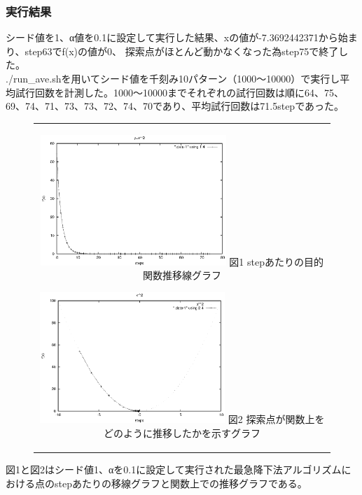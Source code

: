 \subsubsection{実行結果}

シード値を1、α値を0.1に設定して実行した結果、xの値が-7.3692442371から始まり、step63でf(x)の値が0、
探索点がほとんど動かなくなった為step75で終了した。\\
./run\_ave.shを用いてシード値を千刻み10パターン（1000〜10000）で実行し平均試行回数を計測した。1000〜10000までそれぞれの試行回数は順に64、75、69、74、71、73、73、72、74、70であり、平均試行回数は71.5stepであった。
\newline
\begin{figure}[htbp]
  \begin{center}
    \begin{tabular}{c}

      \begin{minipage}{0.5\hsize}
        \begin{center}
          \includegraphics[clip, width=7cm]{./figs/sim2-1_step-1.eps}
          \hspace{1.6cm} 図1 stepあたりの目的関数推移線グラフ
        \end{center}
      \end{minipage}

      \begin{minipage}{0.5\hsize}
        \begin{center}
          \includegraphics[clip, width=7cm]{./figs/sim2-1-1.eps}
          \hspace{1.6cm} 図2 探索点が関数上をどのように推移したかを示すグラフ
        \end{center}
      \end{minipage}

    \end{tabular}
  \end{center}
\end{figure}
\newline
図1と図2はシード値1、αを0.1に設定して実行された最急降下法アルゴリズムにおける点のstepあたりの移線グラフと関数上での推移グラフである。
